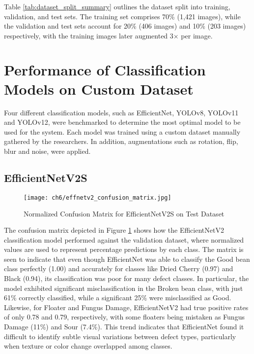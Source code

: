 Table \ref{tab:dataset_split_summary} outlines the dataset split into training, validation, and test sets. The training set comprises 70\% (1,421 images), while the validation and test sets account for 20\% (406 images) and 10\% (203 images) respectively, with the training images later augmented 3× per image.

\section{Performance of Classification Models on Custom Dataset}
\label{sec:perf_custom_dataset}
Four different classification models, such as EfficientNet, YOLOv8, YOLOv11 and YOLOv12, were benchmarked to determine the most optimal model to be used for the system. Each model was trained using a custom dataset manually gathered by the researchers. In addition, augmentations such as rotation, flip, blur and noise, were applied. 

\subsection{EfficientNetV2S}

\begin{figure}[H]
    \centering
    \texttt{[image: ch6/effnetv2\_confusion\_matrix.jpg]} %
    \caption{Normalized Confusion Matrix for EfficientNetV2S on Test Dataset}
    \label{fig:effnetv2s_conf_matrix}
\end{figure}

The confusion matrix depicted in Figure \ref{fig:effnetv2s_conf_matrix} shows how the EfficientNetV2 classification model performed against the validation dataset, where normalized values are used to represent percentage predictions by each class. The matrix is seen to indicate that even though EfficientNet was able to classify the Good bean class perfectly (1.00) and accurately for classes like Dried Cherry (0.97) and Black (0.94), its classification was poor for many defect classes. In particular, the model exhibited significant misclassification in the Broken bean class, with just 61\% correctly classified, while a significant 25\% were misclassified as Good. Likewise, for Floater and Fungus Damage, EfficientNetV2 had true positive rates of only 0.78 and 0.79, respectively, with some floaters being mistaken as Fungus Damage (11\%) and Sour (7.4\%). This trend indicates that EfficientNet found it difficult to identify subtle visual variations between defect types, particularly when texture or color change overlapped among classes. 

